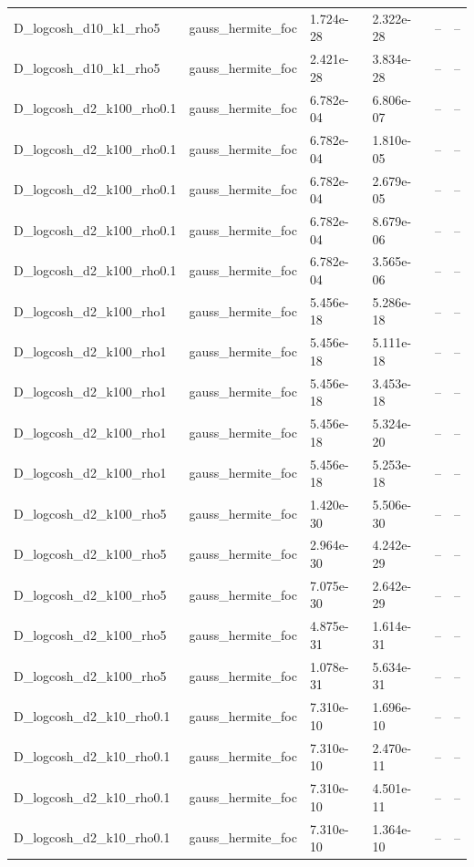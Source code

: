 \begin{tabular}{llllll}
D\_logcosh\_d10\_k1\_rho5 & gauss\_hermite\_foc & 1.724e-28 & 2.322e-28 & -- & -- \\
D\_logcosh\_d10\_k1\_rho5 & gauss\_hermite\_foc & 2.421e-28 & 3.834e-28 & -- & -- \\
D\_logcosh\_d2\_k100\_rho0.1 & gauss\_hermite\_foc & 6.782e-04 & 6.806e-07 & -- & -- \\
D\_logcosh\_d2\_k100\_rho0.1 & gauss\_hermite\_foc & 6.782e-04 & 1.810e-05 & -- & -- \\
D\_logcosh\_d2\_k100\_rho0.1 & gauss\_hermite\_foc & 6.782e-04 & 2.679e-05 & -- & -- \\
D\_logcosh\_d2\_k100\_rho0.1 & gauss\_hermite\_foc & 6.782e-04 & 8.679e-06 & -- & -- \\
D\_logcosh\_d2\_k100\_rho0.1 & gauss\_hermite\_foc & 6.782e-04 & 3.565e-06 & -- & -- \\
D\_logcosh\_d2\_k100\_rho1 & gauss\_hermite\_foc & 5.456e-18 & 5.286e-18 & -- & -- \\
D\_logcosh\_d2\_k100\_rho1 & gauss\_hermite\_foc & 5.456e-18 & 5.111e-18 & -- & -- \\
D\_logcosh\_d2\_k100\_rho1 & gauss\_hermite\_foc & 5.456e-18 & 3.453e-18 & -- & -- \\
D\_logcosh\_d2\_k100\_rho1 & gauss\_hermite\_foc & 5.456e-18 & 5.324e-20 & -- & -- \\
D\_logcosh\_d2\_k100\_rho1 & gauss\_hermite\_foc & 5.456e-18 & 5.253e-18 & -- & -- \\
D\_logcosh\_d2\_k100\_rho5 & gauss\_hermite\_foc & 1.420e-30 & 5.506e-30 & -- & -- \\
D\_logcosh\_d2\_k100\_rho5 & gauss\_hermite\_foc & 2.964e-30 & 4.242e-29 & -- & -- \\
D\_logcosh\_d2\_k100\_rho5 & gauss\_hermite\_foc & 7.075e-30 & 2.642e-29 & -- & -- \\
D\_logcosh\_d2\_k100\_rho5 & gauss\_hermite\_foc & 4.875e-31 & 1.614e-31 & -- & -- \\
D\_logcosh\_d2\_k100\_rho5 & gauss\_hermite\_foc & 1.078e-31 & 5.634e-31 & -- & -- \\
D\_logcosh\_d2\_k10\_rho0.1 & gauss\_hermite\_foc & 7.310e-10 & 1.696e-10 & -- & -- \\
D\_logcosh\_d2\_k10\_rho0.1 & gauss\_hermite\_foc & 7.310e-10 & 2.470e-11 & -- & -- \\
D\_logcosh\_d2\_k10\_rho0.1 & gauss\_hermite\_foc & 7.310e-10 & 4.501e-11 & -- & -- \\
D\_logcosh\_d2\_k10\_rho0.1 & gauss\_hermite\_foc & 7.310e-10 & 1.364e-10 & -- & -- \\

\end{tabular}
